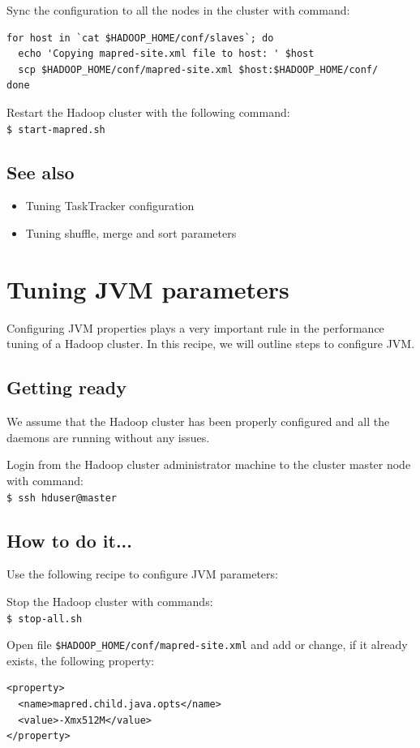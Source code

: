 Sync the configuration to all the nodes in the cluster with command:
\lstset{style=bashstyle}
\begin{lstlisting}
for host in `cat $HADOOP_HOME/conf/slaves`; do
  echo 'Copying mapred-site.xml file to host: ' $host
  scp $HADOOP_HOME/conf/mapred-site.xml $host:$HADOOP_HOME/conf/
done
\end{lstlisting}


Restart the Hadoop cluster with the following command: \\
\verb|$ start-mapred.sh|

\subsection*{See also}
\begin{itemize}
  \item Tuning TaskTracker configuration
  \item Tuning shuffle, merge and sort parameters
\end{itemize}

\section{Tuning JVM parameters}
Configuring JVM properties plays a very important rule in the performance tuning of a Hadoop cluster. In this recipe, we will outline steps to configure JVM.
\subsection*{Getting ready}
We assume that the Hadoop cluster has been properly configured and all the daemons are running without any issues.

Login from the Hadoop cluster administrator machine to the cluster master node with command: \\
\verb|$ ssh hduser@master|
\subsection*{How to do it...}
Use the following recipe to configure JVM parameters:

Stop the Hadoop cluster with commands: \\
\verb|$ stop-all.sh|

Open file \verb|$HADOOP_HOME/conf/mapred-site.xml| and add or change, if it already exists, the following property:
\lstset{style=bashstyle}
\begin{lstlisting}
<property>
  <name>mapred.child.java.opts</name>
  <value>-Xmx512M</value>
</property>
\end{lstlisting}

